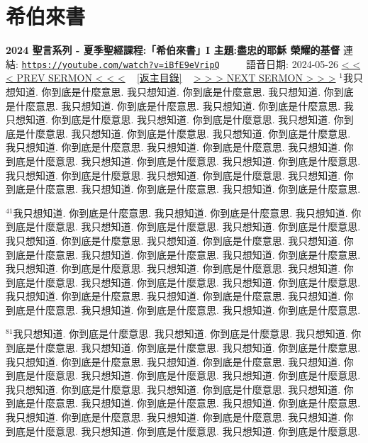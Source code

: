 \documentclass{book}
\begin{document}
\section{希伯來書}
\label{sec:iBfE9eVripQ}
\textbf{2024 聖言系列 - 夏季聖經課程:「希伯來書」I 主題:盡忠的耶穌 榮耀的基督}
\newline
\newline
連結: \href{https://youtube.com/watch?v=iBfE9eVripQ}{\texttt{https://youtube.com/watch?v=iBfE9eVripQ}} ~~~~ 語音日期: 2024-05-26
\newline
\newline
\hyperref[sec:R54GUORH3eY]{\small{< < < PREV SERMON < < <}}
~
\hyperref[sec:index]{\small{[返主目錄]}}
~
\hyperref[sec:7R3qM5b7DMI]{\small{> > > NEXT SERMON > > >}}
\newline
\newline
$^{1}$我只想知道.
你到底是什麼意思.
我只想知道.
你到底是什麼意思.
我只想知道.
你到底是什麼意思.
我只想知道.
你到底是什麼意思.
我只想知道.
你到底是什麼意思.
我只想知道.
你到底是什麼意思.
我只想知道.
你到底是什麼意思.
我只想知道.
你到底是什麼意思.
我只想知道.
你到底是什麼意思.
我只想知道.
你到底是什麼意思.
我只想知道.
你到底是什麼意思.
我只想知道.
你到底是什麼意思.
我只想知道.
你到底是什麼意思.
我只想知道.
你到底是什麼意思.
我只想知道.
你到底是什麼意思.
我只想知道.
你到底是什麼意思.
我只想知道.
你到底是什麼意思.
我只想知道.
你到底是什麼意思.
我只想知道.
你到底是什麼意思.
我只想知道.
你到底是什麼意思.

$^{41}$我只想知道.
你到底是什麼意思.
我只想知道.
你到底是什麼意思.
我只想知道.
你到底是什麼意思.
我只想知道.
你到底是什麼意思.
我只想知道.
你到底是什麼意思.
我只想知道.
你到底是什麼意思.
我只想知道.
你到底是什麼意思.
我只想知道.
你到底是什麼意思.
我只想知道.
你到底是什麼意思.
我只想知道.
你到底是什麼意思.
我只想知道.
你到底是什麼意思.
我只想知道.
你到底是什麼意思.
我只想知道.
你到底是什麼意思.
我只想知道.
你到底是什麼意思.
我只想知道.
你到底是什麼意思.
我只想知道.
你到底是什麼意思.
我只想知道.
你到底是什麼意思.
我只想知道.
你到底是什麼意思.
我只想知道.
你到底是什麼意思.
我只想知道.
你到底是什麼意思.

$^{81}$我只想知道.
你到底是什麼意思.
我只想知道.
你到底是什麼意思.
我只想知道.
你到底是什麼意思.
我只想知道.
你到底是什麼意思.
我只想知道.
你到底是什麼意思.
我只想知道.
你到底是什麼意思.
我只想知道.
你到底是什麼意思.
我只想知道.
你到底是什麼意思.
我只想知道.
你到底是什麼意思.
我只想知道.
你到底是什麼意思.
我只想知道.
你到底是什麼意思.
我只想知道.
你到底是什麼意思.
我只想知道.
你到底是什麼意思.
我只想知道.
你到底是什麼意思.
我只想知道.
你到底是什麼意思.
我只想知道.
你到底是什麼意思.
我只想知道.
你到底是什麼意思.
我只想知道.
你到底是什麼意思.
我只想知道.
你到底是什麼意思.
我只想知道.
你到底是什麼意思.
\end{document}
